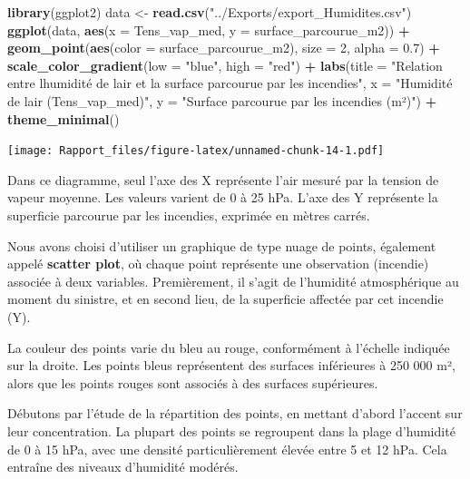 \documentclass[
]{article}
\newenvironment{Shaded}{\begin{snugshade}}{\end{snugshade}}
\newcommand{\AttributeTok}[1]{\textcolor[rgb]{0.13,0.29,0.53}{#1}}
\newcommand{\DecValTok}[1]{\textcolor[rgb]{0.00,0.00,0.81}{#1}}
\newcommand{\FloatTok}[1]{\textcolor[rgb]{0.00,0.00,0.81}{#1}}
\newcommand{\FunctionTok}[1]{\textcolor[rgb]{0.13,0.29,0.53}{\textbf{#1}}}
\newcommand{\NormalTok}[1]{#1}
\newcommand{\OtherTok}[1]{\textcolor[rgb]{0.56,0.35,0.01}{#1}}
\newcommand{\SpecialCharTok}[1]{\textcolor[rgb]{0.81,0.36,0.00}{\textbf{#1}}}
\newcommand{\StringTok}[1]{\textcolor[rgb]{0.31,0.60,0.02}{#1}}
\begin{document}
\begin{Shaded}
\begin{Highlighting}[]
\FunctionTok{library}\NormalTok{(ggplot2)}
\NormalTok{data }\OtherTok{\textless{}{-}} \FunctionTok{read.csv}\NormalTok{(}\StringTok{"../Exports/export\_Humidites.csv"}\NormalTok{)}
\FunctionTok{ggplot}\NormalTok{(data, }\FunctionTok{aes}\NormalTok{(}\AttributeTok{x =}\NormalTok{ Tens\_vap\_med, }\AttributeTok{y =}\NormalTok{ surface\_parcourue\_m2)) }\SpecialCharTok{+}
  \FunctionTok{geom\_point}\NormalTok{(}\FunctionTok{aes}\NormalTok{(}\AttributeTok{color =}\NormalTok{ surface\_parcourue\_m2), }\AttributeTok{size =} \DecValTok{2}\NormalTok{, }\AttributeTok{alpha =} \FloatTok{0.7}\NormalTok{) }\SpecialCharTok{+} 
  \FunctionTok{scale\_color\_gradient}\NormalTok{(}\AttributeTok{low =} \StringTok{"blue"}\NormalTok{, }\AttributeTok{high =} \StringTok{"red"}\NormalTok{) }\SpecialCharTok{+} 
  \FunctionTok{labs}\NormalTok{(}\AttributeTok{title =} \StringTok{"Relation entre l\textquotesingle{}humidité de l\textquotesingle{}air et la surface parcourue par les incendies"}\NormalTok{, }
       \AttributeTok{x =} \StringTok{"Humidité de l\textquotesingle{}air (Tens\_vap\_med)"}\NormalTok{, }
       \AttributeTok{y =} \StringTok{"Surface parcourue par les incendies (m²)"}\NormalTok{) }\SpecialCharTok{+}
  \FunctionTok{theme\_minimal}\NormalTok{()}
\end{Highlighting}
\end{Shaded}

\texttt{[image: Rapport\_files/figure-latex/unnamed-chunk-14-1.pdf]}

Dans ce diagramme, seul l'axe des X représente l'air mesuré par la
tension de vapeur moyenne. Les valeurs varient de 0 à 25 hPa. L'axe des
Y représente la superficie parcourue par les incendies, exprimée en
mètres carrés.

Nous avons choisi d'utiliser un graphique de type nuage de points,
également appelé \textbf{scatter plot}, où chaque point représente une
observation (incendie) associée à deux variables. Premièrement, il
s'agit de l'humidité atmosphérique au moment du sinistre, et en second
lieu, de la superficie affectée par cet incendie (Y).

La couleur des points varie du bleu au rouge, conformément à l'échelle
indiquée sur la droite. Les points bleus représentent des surfaces
inférieures à 250 000 m², alors que les points rouges sont associés à
des surfaces supérieures.

Débutons par l'étude de la répartition des points, en mettant d'abord
l'accent sur leur concentration. La plupart des points se regroupent
dans la plage d'humidité de 0 à 15 hPa, avec une densité
particulièrement élevée entre 5 et 12 hPa. Cela entraîne des niveaux
d'humidité modérés.
\end{document}
